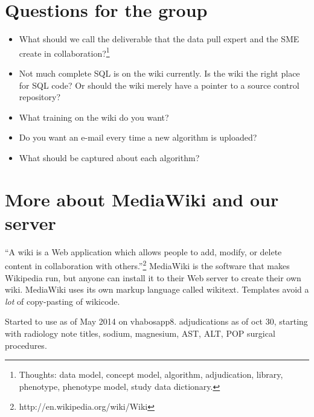 \documentclass{tufte-handout}
\begin{document}
\section{Questions for the group}

\begin{itemize}

\item What should we call the deliverable that the data pull expert
  and the SME create in collaboration?\footnote{Thoughts: data
    model, concept model, algorithm, adjudication, library, phenotype,
    phenotype model, study data dictionary.}

\item Not much complete SQL is on the wiki currently. Is the wiki the
  right place for SQL code? Or should the wiki merely have a pointer
  to a source control repository?

\item What training on the wiki do you want?

\item Do you want an e-mail every time a new algorithm is uploaded?

\item What should be captured about each algorithm?%

\end{itemize}

\section{More about MediaWiki and our server}

``A wiki is a Web application which allows people to add, modify, or
delete content in collaboration with
others.''\footnote{http://en.wikipedia.org/wiki/Wiki} MediaWiki is the
software that makes Wikipedia run, but anyone can install it to their
Web server to create their own wiki. MediaWiki uses its own markup
language called wikitext. Templates avoid a \emph{lot} of copy-pasting
of wikicode.

Started to use as of May 2014 on vhabosapp8. adjudications as of oct
30, starting with radiology note titles, sodium, magnesium, AST, ALT,
POP surgical procedures. 

\end{document}
